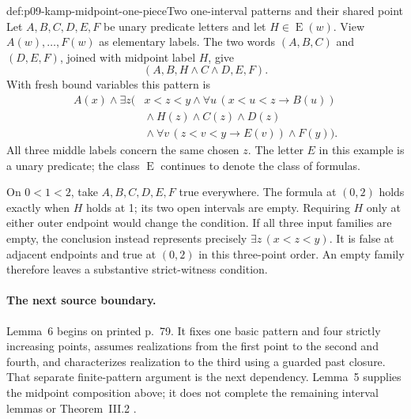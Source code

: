 \begin{hbexample}{def:p09-kamp-midpoint-one-piece}{Two one-interval patterns and their shared point}
Let \(A,B,C,D,E,F\) be unary predicate letters and let
\(H\in\operatorname{E}(w)\). View \(A(w),\ldots,F(w)\) as elementary
labels. The two words \((A,B,C)\) and \((D,E,F)\), joined with
midpoint label \(H\), give
\[
                         (A,B,H\land C\land D,E,F).
\]
With fresh bound variables this pattern is
\[
\begin{split}
 A(x)\land\exists z\bigl(&x<z<y\land
          \forall u\,(x<u<z\to B(u))\\
      &{}\land H(z)\land C(z)\land D(z)\\
      &{}\land\forall v\,(z<v<y\to E(v))\land F(y)\bigr).
\end{split}
\]
All three middle labels concern the same chosen \(z\).
The letter \(E\) in this example is a unary predicate; the class
\(\operatorname{E}\) continues to denote the class of formulas.

On \(0<1<2\), take \(A,B,C,D,E,F\) true everywhere. The formula at
\((0,2)\) holds exactly when \(H\) holds at 1; its two open intervals
are empty. Requiring \(H\) only at either outer endpoint would change
the condition. If all three input families are empty, the conclusion
instead represents precisely \(\exists z\,(x<z<y)\). It is false
at adjacent endpoints and true at \((0,2)\) in this three-point order.
An empty family therefore leaves a substantive strict-witness condition.
\end{hbexample}

\paragraph{The next source boundary.}
Lemma~6 begins on printed p.~79. It fixes one basic pattern and four
strictly increasing points, assumes realizations from the first point
to the second and fourth, and characterizes realization to the third
using a guarded past closure. That separate finite-pattern argument
is the next dependency. Lemma~5 supplies the midpoint composition
above; it does not complete the remaining interval lemmas or
Theorem~III.2 \cite[ch.~III, p.~79]{Kamp1968}.
